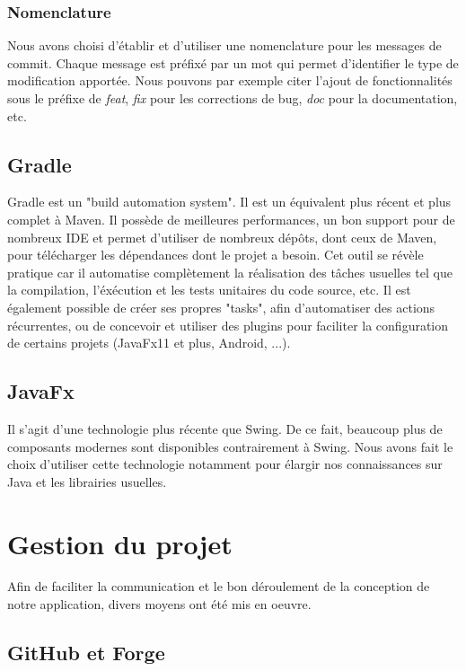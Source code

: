 			\subsubsection{Nomenclature}

				Nous avons choisi d'établir et d'utiliser une nomenclature pour les messages de commit. Chaque message est préfixé par un mot qui permet d'identifier le type de modification apportée. Nous pouvons par exemple citer l'ajout de fonctionnalités sous le préfixe de \textit{feat}, \textit{fix} pour les corrections de bug, \textit{doc} pour la documentation, etc.

		\subsection{Gradle}

			Gradle est un "build automation system". Il est un équivalent plus récent et plus complet à Maven. Il possède de meilleures performances, un bon support pour de nombreux IDE et permet d'utiliser de nombreux dépôts, dont ceux de Maven, pour télécharger les dépendances dont le projet a besoin. Cet outil se révèle pratique car il automatise complètement la réalisation des tâches usuelles tel que la compilation, l'éxécution et les tests unitaires du code source, etc. Il est également possible de créer ses propres "tasks", afin d'automatiser des actions récurrentes, ou de concevoir et utiliser des plugins pour faciliter la configuration de certains projets (JavaFx11 et plus, Android, ...).

		\subsection{JavaFx}

			Il s'agit d'une technologie plus récente que Swing. De ce fait, beaucoup plus de composants modernes sont disponibles contrairement à Swing. Nous avons fait le choix d'utiliser cette technologie notamment pour élargir nos connaissances sur Java et les librairies usuelles.

	\section{Gestion du projet}

		Afin de faciliter la communication et le bon déroulement de la conception de notre application, divers moyens ont été mis en oeuvre.

		\subsection{GitHub et Forge}

